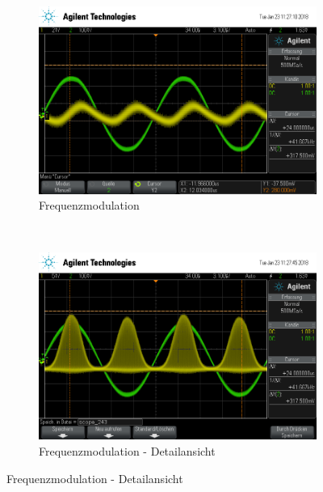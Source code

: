 \begin{figure}[t!]
	\centering
	\begin{subfigure}[t]{0.5\textwidth}
		\centering
		\includegraphics[width=\textwidth]{img/g_scope_242.png}
		\caption{Frequenzmodulation}
	\end{subfigure}%
	~
	\begin{subfigure}[t]{0.5\textwidth}
		\centering
		\includegraphics[width=\textwidth]{img/g_scope_243.png}
		\caption{Frequenzmodulation - Detailansicht}
	\end{subfigure}
\end{figure}

